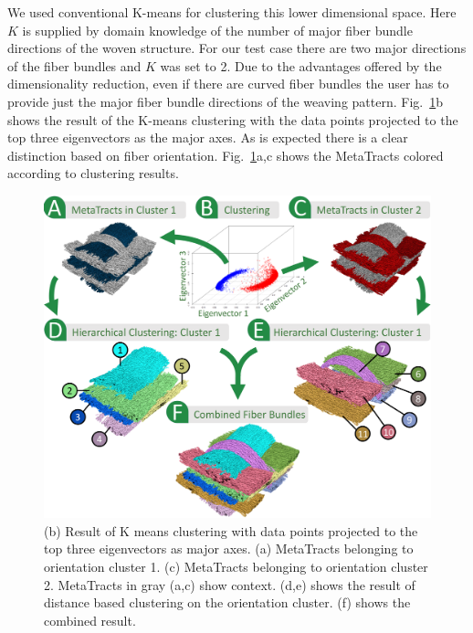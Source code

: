 %  
We used conventional K-means for clustering this lower dimensional space. Here $K$ is supplied by domain knowledge of the number of major fiber bundle directions of the woven structure.
For our test case there are two major directions of the fiber bundles and $K$ was set to 2. Due to the advantages offered by the dimensionality reduction, even if there are curved fiber bundles the user has to provide just the major fiber bundle directions of the weaving pattern. Fig.~\ref{fig:orientation_clustering}b shows the result of the K-means clustering with the data points projected to the top three eigenvectors as the major axes. As is expected there is a clear distinction based on fiber orientation. Fig.~\ref{fig:orientation_clustering}a,c shows the MetaTracts colored according to clustering results.


\begin{figure}[tb] 
  \centering  	
  \includegraphics[width=\linewidth]{images_pvis/clustering.pdf}
  	\caption{(b) Result of K means clustering with data points projected to the top three eigenvectors as major axes. (a) MetaTracts belonging to orientation cluster 1. (c) MetaTracts belonging to orientation cluster 2. MetaTracts in gray (a,c) show context.
  	(d,e) shows the result of distance based clustering on the orientation cluster. (f) shows the combined result. }
  \label{fig:orientation_clustering}
  \end{figure}

